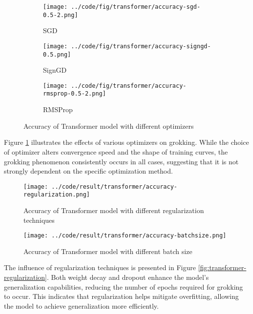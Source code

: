 \documentclass{article}
\begin{document}
\begin{figure}[ht]
    \centering
    \begin{subfigure}{0.3\textwidth}
        \texttt{[image: ../code/fig/transformer/accuracy-sgd-0.5-2.png]}
        \caption{SGD}
    \end{subfigure}
    \begin{subfigure}{0.3\textwidth}
        \texttt{[image: ../code/fig/transformer/accuracy-signgd-0.5.png]}
        \caption{SignGD}
    \end{subfigure}
    \begin{subfigure}{0.3\textwidth}
        \texttt{[image: ../code/fig/transformer/accuracy-rmsprop-0.5-2.png]}
        \caption{RMSProp}
    \end{subfigure}
    \caption{Accuracy of Transformer model with different optimizers}
    \label{fig:transformer-optimizer}
\end{figure}

Figure \ref{fig:transformer-optimizer} illustrates the effects of various optimizers on grokking. While the choice of optimizer alters convergence speed and the shape of training curves, the grokking phenomenon consistently occurs in all cases, suggesting that it is not strongly dependent on the specific optimization method.

\begin{figure}[htbp]
    \centering
    \begin{minipage}[t]{0.45\textwidth}
    \centering
    \texttt{[image: ../code/result/transformer/accuracy-regularization.png]}
    \caption{Accuracy of Transformer model with different regularization techniques}
    \label{fig:transformer-regularization}
    \end{minipage}
    \hspace{0.05\textwidth}
    \begin{minipage}[t]{0.45\textwidth}
    \centering
    \texttt{[image: ../code/result/transformer/accuracy-batchsize.png]}
    \caption{Accuracy of Transformer model with different batch size}
    \label{fig:transformer-batchsize}
    \end{minipage}
\end{figure}

The influence of regularization techniques is presented in Figure \ref{fig:transformer-regularization}. Both weight decay and dropout enhance the model's generalization capabilities, reducing the number of epochs required for grokking to occur. This indicates that regularization helps mitigate overfitting, allowing the model to achieve generalization more efficiently.
\end{document}
